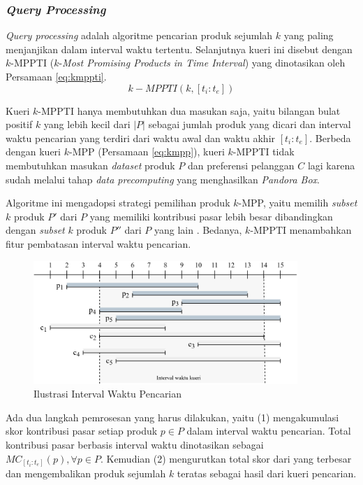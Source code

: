 \subsubsection{\textit{Query Processing}}
\tab \textit{Query processing} adalah algoritme pencarian produk sejumlah $k$ yang paling menjanjikan dalam interval waktu tertentu. Selanjutnya kueri ini disebut dengan $k$-MPPTI ($k$-\textit{Most Promising Products in Time Interval}) yang dinotasikan oleh Persamaan \ref{eq:kmppti}. 
\begin{equation}\label{eq:kmppti}
k-MPPTI(k, [t_i:t_e])
\end{equation} 

Kueri $k$-MPPTI hanya membutuhkan dua masukan saja, yaitu bilangan bulat positif $k$ yang lebih kecil dari $|P|$ sebagai jumlah produk yang dicari dan interval waktu pencarian yang terdiri dari waktu awal dan waktu akhir $[t_i:t_e]$. Berbeda dengan kueri $k$-MPP (Persamaan \ref{eq:kmpp}), kueri $k$-MPPTI tidak membutuhkan masukan \textit{dataset} produk $P$ dan preferensi pelanggan $C$ lagi karena sudah melalui tahap \textit{data precomputing} yang menghasilkan \textit{Pandora Box}.  

Algoritme ini mengadopsi strategi pemilihan produk $k$-MPP, yaitu memilih \textit{subset} $k$ produk $P'$ dari $P$ yang memiliki kontribusi pasar lebih besar dibandingkan dengan \textit{subset} $k$ produk $P''$ dari $P$ yang lain \cite{kmpp}. Bedanya, $k$-MPPTI menambahkan fitur pembatasan interval waktu pencarian.

\begin{figure}[h]
	\centering
	\includegraphics[width=10cm]{assets/img/bab3/timeline-interval.png}
	\caption{Ilustrasi Interval Waktu Pencarian}
	\label{fig:timeline-kueri}
\end{figure}

Ada dua langkah pemrosesan yang harus dilakukan, yaitu (1) mengakumulasi skor kontribusi pasar setiap produk $p \in P$ dalam interval waktu pencarian. Total kontribusi pasar berbasis interval waktu dinotasikan sebagai $MC_{[t_i:t_e]}(p), \forall p \in P$. Kemudian (2) mengurutkan total skor dari yang terbesar dan mengembalikan produk sejumlah $k$ teratas sebagai hasil dari kueri pencarian. 

